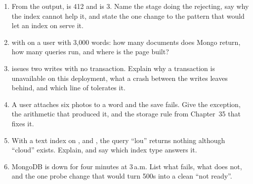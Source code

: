 \begin{quiz}
\begin{enumerate}
  \item From the  output,  is 412
  and  is 3. Name the stage doing the rejecting, say
  why the  index cannot help it, and state the
  one change to the pattern that would let an index on 
  serve it.
  \item {} with  on a user with
  3{,}000 words: how many documents does Mongo return, how many
   queries run, and where is the page built?
  \item {} issues two writes with no transaction.
  Explain why a transaction is unavailable on this deployment, what a
  crash between the writes leaves behind, and which line of
   tolerates it.
  \item A user attaches six photos to a word and the save fails. Give
  the exception, the arithmetic that produced it, and the storage rule
  from Chapter~35 that fixes it.
  \item With a text index on ,  and
  , the query ``lou'' returns nothing although
  ``cloud'' exists. Explain, and say which index type answers it.
  \item MongoDB is down for four minutes at 3\,a.m. List what fails,
  what does not, and the one probe change that would turn 500s into a
  clean ``not ready''.
\end{enumerate}
\end{quiz}
